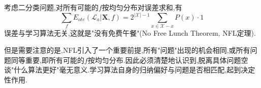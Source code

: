 考虑二分类问题,对所有可能的$f$按均匀分布对误差求和,有
\begin{equation}
\sum_fE_{ote}(\mathcal L_a|\mathbf X,f)=2^{|\mathcal X|-1}\sum_{x\in\mathcal X-x}P(x)\cdot 1
\end{equation}
误差与学习算法无关,这就是"没有免费午餐"(No Free Lunch Theorem, NFL定理).

但是需要注意的是,NFL引入了一个重要前提,所有"问题"出现的机会相同,或所有问题同等重要,即所有可能的$f$按均匀分布.因此必须清楚地认识到,脱离具体问题空谈"什么算法更好"毫无意义.学习算法自身的归纳偏好与问题是否相匹配,起到决定性作用.